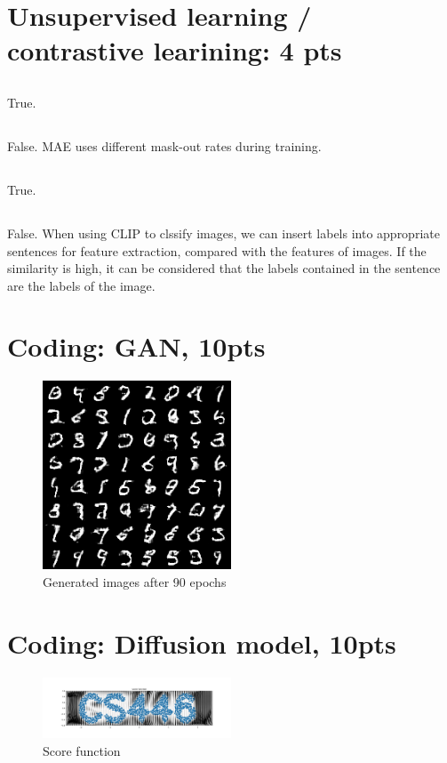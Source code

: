 \documentclass[12pt]{article}
\begin{document}
\newpage

\section{Unsupervised learning / contrastive learining: 4 pts}
\subsection{}
True.
\subsection{}
False. MAE uses different mask-out rates during training.
\subsection{}
True.
\subsection{}
False. When using CLIP to clssify images, we can insert labels into appropriate sentences for feature extraction, compared with the features of images. If the similarity is high, it can be considered that the labels contained in the sentence are the labels of the image.
\newpage

\section{Coding: GAN, 10pts}

\begin{figure}[H]
    \centering
    \includegraphics[width=0.5\textwidth]{codes/imgs/gan/test_90.png}
    \caption{Generated images after 90 epochs}
    \label{fig:gan}
\end{figure}


\newpage

\section{Coding: Diffusion model, 10pts}
\begin{figure}[H]
    \centering
    \includegraphics[width=0.5\textwidth]{codes/imgs/diffusion/score_function.png}
    \caption{Score function}
    \label{fig:score}
\end{figure}
\end{document}
